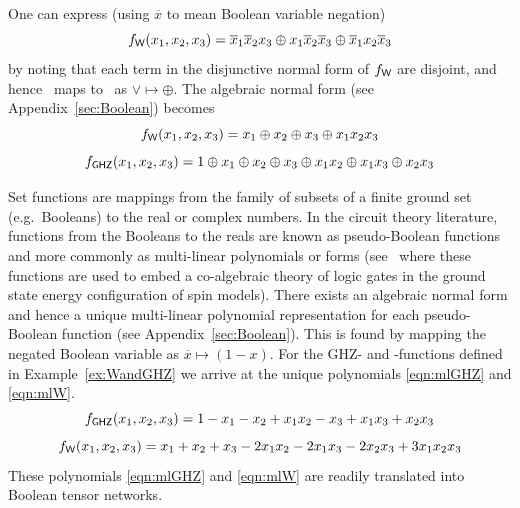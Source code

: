 \begin{example}\label{ex:WandGHZBoolean}
One can express (using $\overline x$ to mean Boolean variable negation)
\begin{equation}
f_{\text{\sf W}}(x_1,x_2,x_3)=\overline x_1\overline x_2x_3\oplus
x_1\overline x_2\overline x_3\oplus \overline x_1x_2\overline x_3
\end{equation}
by noting that each term in the disjunctive normal form of $f_{\text{\sf W}}$ are disjoint, and
hence \OR~maps to \XOR~as $\vee\mapsto \oplus$.  The algebraic normal form (see
Appendix~\ref{sec:Boolean}) becomes
\begin{equation}\label{eqn:fWBoolean}
f_{\text{\sf W}}(x_1,x_2,x_3)=x_1 \oplus x_2\oplus x_3\oplus x_1 x_2 x_3
\end{equation}
\begin{equation}
f_{{\sf GHZ}}(x_1,x_2,x_3) =1\oplus x_1\oplus x_2\oplus x_3\oplus x_1 x_2\oplus
x_1x_3\oplus x_2x_3
\end{equation}
\end{example}

\begin{example} \label{ex:mlWandGHZ}
Set functions are mappings from the family of subsets of a finite ground set (e.g.\
Booleans) to the real or complex numbers.  In the circuit theory literature,
functions from the Booleans to the reals are known as pseudo-Boolean functions and
more commonly as
multi-linear polynomials or forms (see~\cite{JDB08} where these functions are used to
embed a co-algebraic theory of logic gates in the ground state energy configuration of
spin models). There exists an algebraic normal form and hence a unique multi-linear
polynomial representation for each pseudo-Boolean
function (see Appendix~\ref{sec:Boolean}).  This is found by mapping the negated
Boolean variable as
$\overline{x}\mapsto
(1-x)$.  For the {\sf GHZ}- and \W-functions defined in Example~\ref{ex:WandGHZ} we
arrive
at the unique polynomials \eqref{eqn:mlGHZ} and \eqref{eqn:mlW}.
\begin{equation}\label{eqn:mlGHZ}
f_{{\sf GHZ}}(x_1,x_2,x_3)=1 - x_1 - x_2 + x_1 x_2 - x_3 + x_1 x_3 + x_2 x_3
\end{equation}
\begin{equation}\label{eqn:mlW}
f_{\text{\sf W}}(x_1,x_2,x_3) = x_1 + x_2 + x_3 - 2 x_1 x_2 - 2 x_1 x_3 - 2 x_2 x_3 + 3 x_1
x_2 x_3
\end{equation}
These polynomials \eqref{eqn:mlGHZ} and \eqref{eqn:mlW} are readily translated into
Boolean tensor networks.
\end{example}

